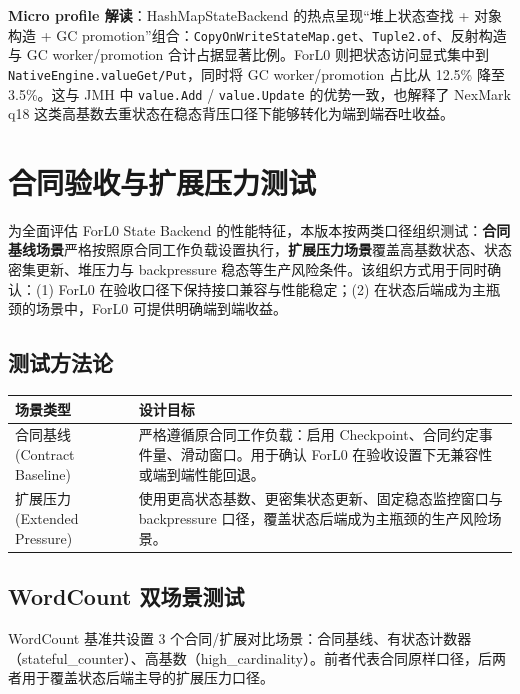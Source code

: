 \documentclass[a4paper,11pt]{article}
\newcommand{\project}{ForL0 State Backend}
\begin{document}
\textbf{Micro profile 解读}：HashMapStateBackend 的热点呈现“堆上状态查找 + 对象构造 + GC promotion”组合：\texttt{CopyOnWriteStateMap.get}、\texttt{Tuple2.of}、反射构造与 GC worker/promotion 合计占据显著比例。ForL0 则把状态访问显式集中到 \texttt{NativeEngine.valueGet/Put}，同时将 GC worker/promotion 占比从 12.5\% 降至 3.5\%。这与 JMH 中 \texttt{value.Add} / \texttt{value.Update} 的优势一致，也解释了 NexMark q18 这类高基数去重状态在稳态背压口径下能够转化为端到端吞吐收益。

\section{合同验收与扩展压力测试}

为全面评估 \project{} 的性能特征，本版本按两类口径组织测试：\textbf{合同基线场景}严格按照原合同工作负载设置执行，\textbf{扩展压力场景}覆盖高基数状态、状态密集更新、堆压力与 backpressure 稳态等生产风险条件。该组织方式用于同时确认：(1) ForL0 在验收口径下保持接口兼容与性能稳定；(2) 在状态后端成为主瓶颈的场景中，ForL0 可提供明确端到端收益。

\subsection{测试方法论}

\begin{table}[H]
\centering
\small
\begin{tabularx}{\textwidth}{L{3.0cm} X}
\toprule
\textbf{场景类型} & \textbf{设计目标} \\
\midrule
合同基线 (Contract Baseline) & 严格遵循原合同工作负载：启用 Checkpoint、合同约定事件量、滑动窗口。用于确认 ForL0 在验收设置下无兼容性或端到端性能回退。 \\
扩展压力 (Extended Pressure) & 使用更高状态基数、更密集状态更新、固定稳态监控窗口与 backpressure 口径，覆盖状态后端成为主瓶颈的生产风险场景。 \\
\bottomrule
\end{tabularx}
\end{table}

\subsection{WordCount 双场景测试}

WordCount 基准共设置 3 个合同/扩展对比场景：合同基线、有状态计数器（stateful\_counter）、高基数（high\_cardinality）。前者代表合同原样口径，后两者用于覆盖状态后端主导的扩展压力口径。
\end{document}
